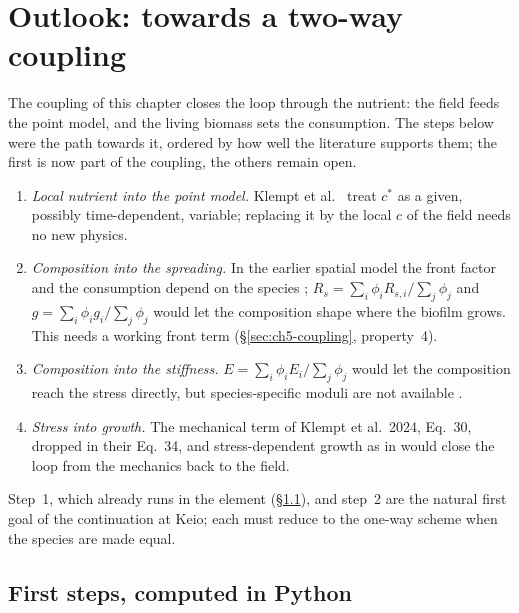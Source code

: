 \section{Outlook: towards a two-way coupling}
\label{sec:ch5-outlook}

The coupling of this chapter closes the loop through the nutrient: the field
feeds the point model, and the living biomass sets the consumption. The steps
below were the path towards it, ordered by how well the literature supports
them; the first is now part of the coupling, the others remain open.
\begin{enumerate}
\item \emph{Local nutrient into the point model.} Klempt et
      al.~\cite{Klempt2026ContinuumBacterialGrowth} treat $c^*$ as a given,
      possibly time-dependent, variable; replacing it by the local $c$ of the
      field needs no new physics.
\item \emph{Composition into the spreading.} In the earlier spatial model the
      front factor and the consumption depend on the species
      \cite{Klempt2023NumericalComparison}; $R_s=\sum_i\phi_iR_{s,i}/\sum_j\phi_j$ and
      $g=\sum_i\phi_i g_i/\sum_j\phi_j$ would let the composition shape where the biofilm
      grows. This needs a working front term
      (\S\ref{sec:ch5-coupling}, property~4).
\item \emph{Composition into the stiffness.} $E=\sum_i\phi_iE_i/\sum_j\phi_j$ would let the
      composition reach the stress directly, but species-specific moduli are
      not available \cite{Bol2013BiofilmMechanicalCharacterisation}.
\item \emph{Stress into growth.} The mechanical term of Klempt et al.\ 2024,
      Eq.~30, dropped in their Eq.~34, and stress-dependent growth as in
      \cite{Soleimani2020AnisotropicGrowth} would close the loop from the
      mechanics back to the field.
\end{enumerate}
Step~1, which already runs in the element
(\S\ref{sec:ch5-outlook-python}), and step~2 are the natural first goal of
the continuation at Keio; each
must reduce to the one-way scheme when the species are made equal.

\subsection{First steps, computed in Python}
\label{sec:ch5-outlook-python}

